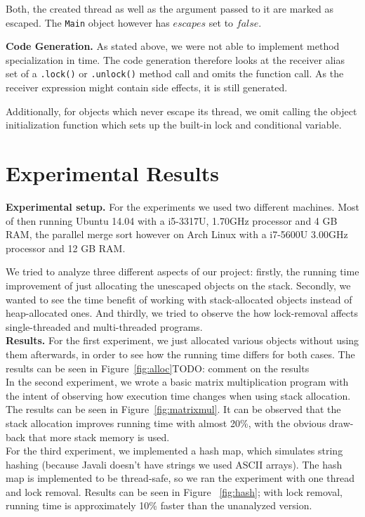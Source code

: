 \documentclass[letterpaper]{article}
\newcommand{\mypar}[1]{{\bf #1.}}
\begin{document}
Both, the created thread as well as the argument passed to it are marked as escaped. The \texttt{Main} object however
has $escapes$ set to $false$.

\mypar{Code Generation}
As stated above, we were not able to implement method specialization in time. The code generation
therefore looks at the receiver alias set of a \texttt{.lock()} or  \texttt{.unlock()} method
call and omits the function call. As the receiver expression might contain side effects, it
is still generated.

Additionally, for objects which never escape its thread, we omit calling the object initialization
function which sets up the built-in lock and conditional variable.


\section{Experimental Results}\label{sec:exp}


\mypar{Experimental setup} For the experiments we used two different machines. Most of then running
Ubuntu 14.04 with a i5-3317U, 1.70GHz processor and 4 GB RAM, the parallel merge sort however
on Arch Linux with a i7-5600U 3.00GHz processor and 12 GB RAM.

We tried to analyze three different aspects of our project: firstly, the running time improvement of just allocating
the unescaped objects on the stack. Secondly, we wanted to see the time benefit of working with stack-allocated
objects instead of heap-allocated ones. And thirdly, we tried to observe the how lock-removal affects single-threaded
and multi-threaded programs.\\

\mypar{Results}
For the first experiment, we just allocated various objects without using them afterwards, in order to see how the running time differs
for both cases. The results can be seen in Figure~\ref{fig:alloc}TODO: comment on the results\\

In the second experiment, we wrote a basic matrix multiplication program with the intent of observing how execution time changes when using
stack allocation. The results can be seen in Figure~\ref{fig:matrixmul}. It can be observed that the stack allocation improves running
time with almost 20\%, with the obvious draw-back that more stack memory is used.\\

For the third experiment, we implemented a hash map, which simulates string hashing (because Javali doesn't have strings we used ASCII arrays).
The hash map is implemented to be thread-safe, so we ran the experiment with one thread and lock removal. Results can be seen in Figure~
\ref{fig:hash}; with lock removal, running time is approximately 10\% faster than the unanalyzed version.\\
\end{document}
